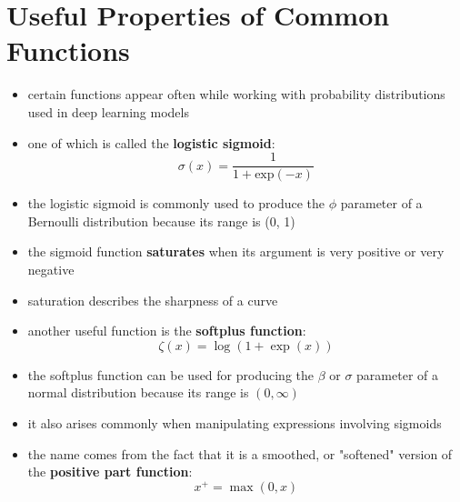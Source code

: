 \documentclass[11pt, twocolumn]{report}
\begin{document}
\section{Useful Properties of Common Functions}
\begin{itemize}
  \item certain functions appear often while working with probability
    distributions used in deep learning models
  \item one of which is called the \textbf{logistic sigmoid}:
    \begin{equation}
      \sigma(x) = \frac{1}{1 + \text{exp}(-x)}
    \end{equation}
  \item the logistic sigmoid is commonly used to produce the $\phi$ parameter
    of a Bernoulli distribution because its range is (0, 1)
  \item the sigmoid function \textbf{saturates} when its argument is very
    positive or very negative
  \item saturation describes the sharpness of a curve
  \item another useful function is the \textbf{softplus function}:
    \begin{equation}
      \zeta(x) = \log(1 + \exp(x))
    \end{equation}
  \item the softplus function can be used for producing the $\beta$ or $\sigma$
    parameter of a normal distribution because its range is $(0, \infty)$
  \item it also arises commonly when manipulating expressions involving sigmoids
  \item the name comes from the fact that it is a smoothed, or "softened"
    version of the \textbf{positive part function}:
    \begin{equation}
      x^+ = \max(0, x)
    \end{equation}
\end{itemize}
\end{document}
